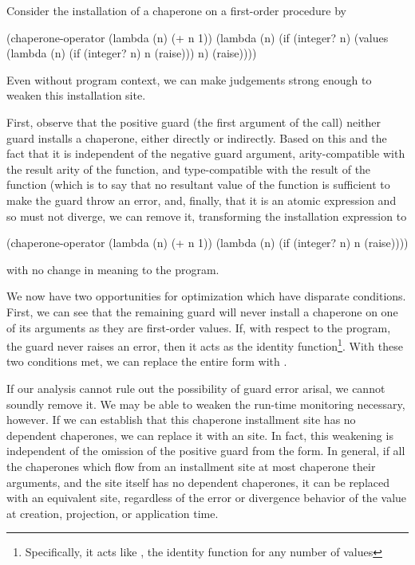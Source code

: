 \documentclass{sigplanconf}
\begin{document}
Consider the installation of a chaperone on a first-order procedure by
\begin{schemedisplay}
(chaperone-operator
 (lambda (n) (+ n 1))
 (lambda (n)
    (if (integer? n)
        (values (lambda (n)
                  (if (integer? n)
                      n
                      (raise)))
                n)
        (raise))))
\end{schemedisplay}
Even without program context, we can make judgements strong enough to weaken this installation site.

First, observe that the positive guard (the first argument of the  call) neither guard installs a chaperone, either directly or indirectly.
Based on this and the fact that it is independent of the negative guard argument, arity-compatible with the result arity of the function, and type-compatible with the result of the function (which is to say that no resultant value of the function is sufficient to make the guard throw an error, and, finally, that it is an atomic expression and so must not diverge, we can remove it, transforming the installation expression to
\begin{schemedisplay}
(chaperone-operator
 (lambda (n) (+ n 1))
 (lambda (n)
    (if (integer? n)
        n
        (raise))))
\end{schemedisplay}
with no change in meaning to the program.

We now have two opportunities for optimization which have disparate conditions.
First, we can see that the remaining guard will never install a chaperone on one of its arguments as they are first-order values.
If, with respect to the program, the guard never raises an error, then it acts as the identity function\footnote{Specifically, it acts like , the identity function for any number of values}.
With these two conditions met, we can replace the entire form with .

If our analysis cannot rule out the possibility of guard error arisal, we cannot soundly remove it.
We may be able to weaken the run-time monitoring necessary, however.
If we can establish that this chaperone installment site has no dependent chaperones, we can replace it with an  site.
In fact, this weakening is independent of the omission of the positive guard from the form.
In general, if all the chaperones which flow from an installment site at most chaperone their arguments, and the site itself has no dependent chaperones, it can be replaced with an equivalent  site, regardless of the error or divergence behavior of the value at creation, projection, or application time.
\end{document}
